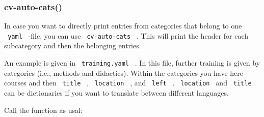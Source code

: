 \subsubsection{cv-auto-cats()}\label{cv-auto-cats}

In case you want to directly print entries from categories that belong
to one \texttt{\ yaml\ } -file, you can use \texttt{\ cv-auto-cats\ } .
This will print the header for each subcategory and then the belonging
entries.

An example is given in \texttt{\ training.yaml\ } . In this file,
further training is given by categories (i.e., methods and didactics).
Within the categories you have here courses and then \texttt{\ title\ }
, \texttt{\ location\ } , and \texttt{\ left\ } . \texttt{\ location\ }
and \texttt{\ title\ } can be dictionaries if you want to translate
between different languages.

\begin{Shaded}
\begin{Highlighting}[]
\KeywordTok{:}
\AttributeTok{  }\KeywordTok{:}
\AttributeTok{    }\KeywordTok{:}
\AttributeTok{    }\KeywordTok{:}
\AttributeTok{    }\KeywordTok{:}\AttributeTok{ }
\KeywordTok{:}
\AttributeTok{  }\KeywordTok{:}
\AttributeTok{    }\KeywordTok{:}
\AttributeTok{      }\KeywordTok{:}
\AttributeTok{      }\KeywordTok{:}
\AttributeTok{      }\KeywordTok{:}
\AttributeTok{    }\KeywordTok{:}\AttributeTok{ }
\AttributeTok{      }\KeywordTok{:}
\AttributeTok{      }\KeywordTok{:}
\AttributeTok{      }\KeywordTok{:}
\AttributeTok{    }\KeywordTok{:}\AttributeTok{ }
\end{Highlighting}
\end{Shaded}

Call the function as usal:

\begin{Shaded}
\begin{Highlighting}[]

\end{Highlighting}
\end{Shaded}

